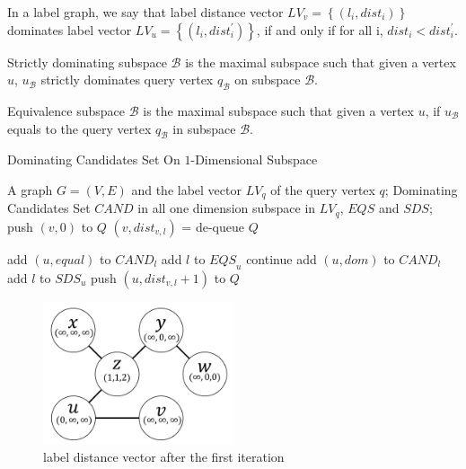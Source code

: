 \begin{definition}
In a label graph, we say that label distance vector $LV_v=\left\{(l_i, dist_i)\right\}$ dominates label vector $LV_u=\left\{(l_i, dist_i^\prime)\right\}$, if and only if for all i, $dist_i < dist_i^\prime$.
\end{definition}

\begin{definition}
Strictly dominating subspace $\mathcal{B}$ is the maximal subspace such that given a vertex $u$, $u_\mathcal{B}$ strictly dominates query vertex $q_\mathcal{B}$ on subspace $\mathcal{B}$.
\end{definition}

\begin{definition}
Equivalence subspace $\mathcal{B}$ is the maximal subspace such that given a vertex $u$, if $u_\mathcal{B}$ equals to the query vertex $q_\mathcal{B}$ in subspace $\mathcal{B}$.
\end{definition}

\begin{algorithm}[h]
  \caption{Dominating Candidates Set On $1$-Dimensional Subspace}\label{algo:blah}
  \begin{algorithmic}[1]
  \show\LOOP
    \REQUIRE A graph $G=(V,E)$ and the label vector $LV_q$ of the query vertex $q$;
    \ENSURE Dominating Candidates Set $\mathit{CAND}$ in all one dimension subspace in $LV_q$, $\mathit{EQS}$ and $\mathit{SDS}$;
            \STATE push $\left(v, 0\right)$ to $Q$
        \ENDFOR
            \STATE $\left(v, dist_{v,l}\right)$ = de-queue $Q$
            
                \STATE add $\left(u, equal\right)$ to $\mathit{CAND}_l$
                \STATE add $l$ to $\mathit{EQS}_u$
                \STATE continue
            \ENDIF
            \STATE add $\left(u, dom\right)$ to $\mathit{CAND}_l$
            \STATE add $l$ to $\mathit{SDS}_u$
                \STATE push $\left(u, dist_{v,l}+1\right)$ to $Q$
            \ENDFOR
        \ENDWHILE
    \ENDFOR
  \end{algorithmic}
\end{algorithm}

\begin{figure}[h]
    \centering
    \includegraphics[width=0.5\textwidth]{figs/graph_example_1}
    \caption{\label{font-figure}label distance vector after the first iteration}
    \label{fig:cand_step1}
\end{figure}


